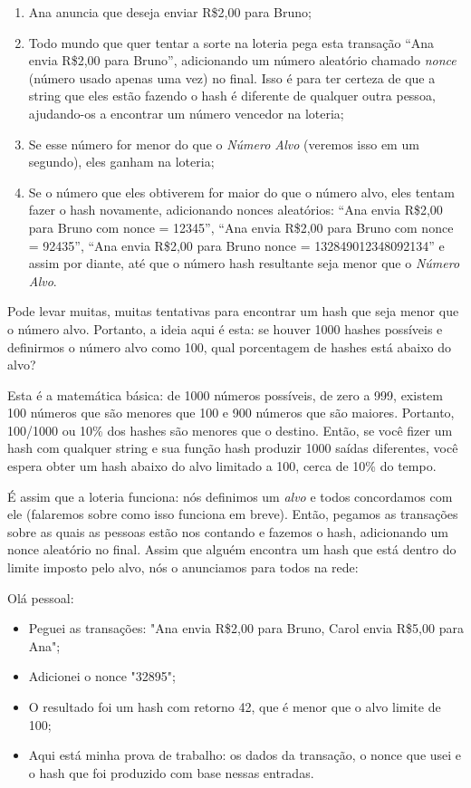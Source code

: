\begin{enumerate}
\item Ana anuncia que deseja enviar R\$2,00 para Bruno;
\item Todo mundo que quer tentar a sorte na loteria pega esta transação “Ana envia R\$2,00 para Bruno”, adicionando um número aleatório chamado \textit{nonce} (número usado apenas uma vez) no final. Isso é para ter certeza de que a string que eles estão fazendo o hash é diferente de qualquer outra pessoa, ajudando-os a encontrar um número vencedor na loteria;
\item Se esse número for menor do que o \textit{Número Alvo} (veremos isso em um segundo), eles ganham na loteria;
\item Se o número que eles obtiverem for maior do que o número alvo, eles tentam fazer o hash novamente, adicionando nonces aleatórios: “Ana envia R\$2,00 para Bruno com nonce = 12345”, “Ana envia R\$2,00 para Bruno com nonce = 92435”, “Ana envia R\$2,00 para Bruno nonce = 132849012348092134” e assim por diante, até que o número hash resultante seja menor que o \textit{Número Alvo}.
\end{enumerate}

Pode levar muitas, muitas tentativas para encontrar um hash que seja menor que o número alvo. Portanto, a ideia aqui é esta: se houver 1000 hashes possíveis e definirmos o número alvo como 100, qual porcentagem de hashes está abaixo do alvo?

Esta é a matemática básica: de 1000 números possíveis, de zero a 999, existem 100 números que são menores que 100 e 900 números que são maiores. Portanto, 100/1000 ou 10\% dos hashes são menores que o destino. Então, se você fizer um hash com qualquer string e sua função hash produzir 1000 saídas diferentes, você espera obter um hash abaixo do alvo limitado a 100, cerca de 10\% do tempo.

É assim que a loteria funciona: nós definimos um \textit{alvo} e todos concordamos com ele (falaremos sobre como isso funciona em breve). Então, pegamos as transações sobre as quais as pessoas estão nos contando e fazemos o hash, adicionando um nonce aleatório no final. Assim que alguém encontra um hash que está dentro do limite imposto pelo alvo, nós o anunciamos para todos na rede:

Olá pessoal:
\begin{itemize}
\item Peguei as transações: "Ana envia R\$2,00 para Bruno, Carol envia R\$5,00 para Ana";
\item Adicionei o nonce "32895";
\item O resultado foi um hash com retorno 42, que é menor que o alvo limite de 100;
\item Aqui está minha prova de trabalho: os dados da transação, o nonce que usei e o hash que foi produzido com base nessas entradas.
\end{itemize}

